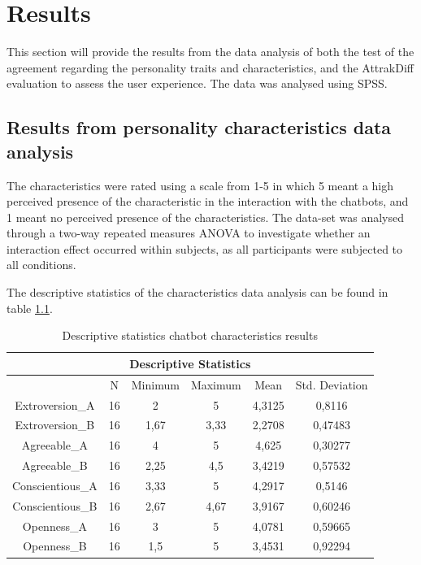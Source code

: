 \chapter{Results}
\label{chap:results}

This section will provide the results from the data analysis of both the test of the agreement regarding the personality traits and characteristics, and the AttrakDiff evaluation to assess the user experience. The data was analysed using SPSS.

\section{Results from personality characteristics data analysis}

The characteristics were rated using a scale from 1-5 in which 5 meant a high perceived presence of the characteristic in the interaction with the chatbots, and 1 meant no perceived presence of the characteristics. The data-set was analysed through a two-way repeated measures ANOVA to investigate whether an interaction effect occurred within subjects, as all participants were subjected to all conditions.

The descriptive statistics of the characteristics data analysis can be found in table \ref{table:5}.

\begin{table}[h]
\centering
\begin{tabular}{cccccc}
\hline
\multicolumn{6}{c}{\textbf{Descriptive Statistics}} \\
\hline
& N & Minimum & Maximum & Mean & Std. Deviation \\
Extroversion_A & 16 & 2 & 5 & 4,3125 & 0,8116 \\
Extroversion_B & 16 & 1,67 & 3,33 & 2,2708 & 0,47483 \\
Agreeable_A & 16 & 4 & 5 & 4,625 & 0,30277 \\
Agreeable_B & 16 & 2,25 & 4,5 & 3,4219 & 0,57532 \\
Conscientious_A & 16 & 3,33 & 5 & 4,2917 & 0,5146 \\
Conscientious_B & 16 & 2,67 & 4,67 & 3,9167 & 0,60246 \\
Openness_A & 16 & 3 & 5 & 4,0781 & 0,59665 \\
Openness_B & 16 & 1,5 & 5 & 3,4531 & 0,92294 \\
\end{tabular}
 \caption{Descriptive statistics chatbot characteristics results}
 \label{table:5}
    \end{table}

